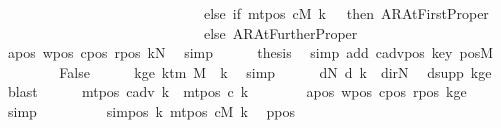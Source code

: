 \begin{isabellebody}
\ \ \ \ \ \ \ \ \ \ \ \ \ \ \ \ \ \ \ \ \ \ \ \ \ \ \ \ \ else\ if\ mt{\isacharunderscore}{\kern0pt}pos\ cM\ k\ {\isacharequal}{\kern0pt}\ {}\ then\ AR{\isacharunderscore}{\kern0pt}AtFirstProper\isanewline
\ \ \ \ \ \ \ \ \ \ \ \ \ \ \ \ \ \ \ \ \ \ \ \ \ \ \ \ \ else\ AR{\isacharunderscore}{\kern0pt}AtFurtherProper{\isacharparenright}{\kern0pt}{\isacharparenright}{\kern0pt}{\isachardoublequoteclose}\isanewline
\ \ \ \ \ \ \isamarkupfalse%
\ a{\isacharunderscore}{\kern0pt}pos\ w{\isacharunderscore}{\kern0pt}pos\ c{\isacharunderscore}{\kern0pt}pos\ r{\isacharunderscore}{\kern0pt}pos\ kN\ \isamarkupfalse%
\ simp\isanewline
\ \ \ \ \isamarkupfalse%
\ {\isacharquery}{\kern0pt}thesis\ \isamarkupfalse%
\ {\isacharparenleft}{\kern0pt}simp\ add{\isacharcolon}{\kern0pt}\ c{\isacharunderscore}{\kern0pt}adv{\isacharunderscore}{\kern0pt}pos\ key\ posM{}{\isacharparenright}{\kern0pt}\isanewline
\ \ \isamarkupfalse%
\isanewline
\ \ \ \ \isamarkupfalse%
\ False\isanewline
\ \ \ \ \isamarkupfalse%
\ kge{\isacharcolon}{\kern0pt}\ {\isachardoublequoteopen}k{\isacharunderscore}{\kern0pt}tm\ M\ {\isasymle}\ k{\isachardoublequoteclose}\ \isamarkupfalse%
\ simp\isanewline
\ \ \ \ \isamarkupfalse%
\ dN{\isacharcolon}{\kern0pt}\ {\isachardoublequoteopen}d\ k\ {\isacharequal}{\kern0pt}\ dir{\isachardot}{\kern0pt}N{\isachardoublequoteclose}\ \isamarkupfalse%
\ dsupp\ kge\ \isamarkupfalse%
\ blast\isanewline
\ \ \ \ \isamarkupfalse%
\ {\isachardoublequoteopen}mt{\isacharunderscore}{\kern0pt}pos\ c{\isacharunderscore}{\kern0pt}adv\ k\ {\isacharequal}{\kern0pt}\ mt{\isacharunderscore}{\kern0pt}pos\ c{\isacharprime}{\kern0pt}\ k{\isachardoublequoteclose}\isanewline
\ \ \ \ \ \ \isamarkupfalse%
\ a{\isacharunderscore}{\kern0pt}pos\ w{\isacharunderscore}{\kern0pt}pos\ c{\isacharunderscore}{\kern0pt}pos\ r{\isacharunderscore}{\kern0pt}pos\ kge\ \isamarkupfalse%
\ simp\isanewline
\ \ \ \ \isamarkupfalse%
\ \isamarkupfalse%
\ {\isachardoublequoteopen}{\isasymdots}\ {\isacharequal}{\kern0pt}\ sim{\isacharunderscore}{\kern0pt}pos\ {\isacharquery}{\kern0pt}k\ {\isacharparenleft}{\kern0pt}mt{\isacharunderscore}{\kern0pt}pos\ cM\ k{\isacharparenright}{\kern0pt}{\isachardoublequoteclose}\ \isamarkupfalse%
\ ppos{}\ \isamarkupfalse%

\end{isabellebody}
